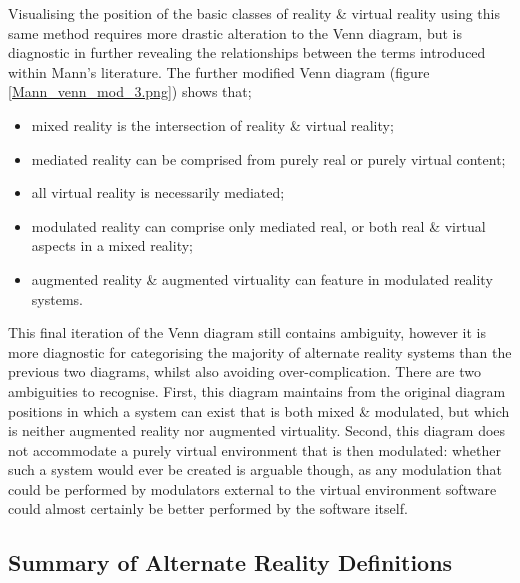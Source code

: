 Visualising the position of the basic classes of reality \& virtual reality using this same method requires more drastic alteration to the Venn diagram, but is diagnostic in further revealing the relationships between the terms introduced within Mann's literature. The further modified Venn diagram (figure \ref{Mann_venn_mod_3.png}) shows that;
\begin{itemize}
	\item mixed reality is the intersection of reality \& virtual reality;
	\item mediated reality can be comprised from purely real or purely virtual content;
	\item all virtual reality is necessarily mediated;
	\item modulated reality can comprise only mediated real, or both real \& virtual aspects in a mixed reality;
	\item augmented reality \& augmented virtuality can feature in modulated reality systems.
\end{itemize}

This final iteration of the Venn diagram still contains ambiguity, however it is more diagnostic for categorising the majority of alternate reality systems than the previous two diagrams, whilst also avoiding over-complication. There are two ambiguities to recognise. First, this diagram maintains from the original diagram positions in which a system can exist that is both mixed \& modulated, but which is neither augmented reality nor augmented virtuality. Second, this diagram does not accommodate a purely virtual environment that is then modulated: whether such a system would ever be created is arguable though, as any modulation that could be performed by modulators external to the virtual environment software could almost certainly be better performed by the software itself.


\clearpage

\subsection{Summary of Alternate Reality Definitions}
\label{summaryofalternaterealitydefinitions}

